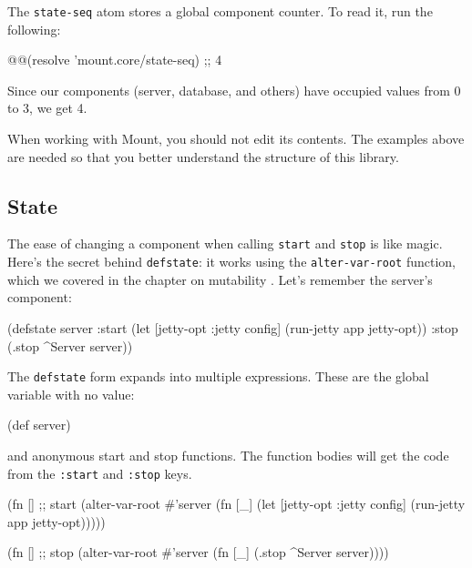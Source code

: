 The \verb|state-seq| atom stores a global component counter. To read it, run the following:

\begin{english}
  \begin{clojure}
@@(resolve 'mount.core/state-seq) ;; 4
  \end{clojure}
\end{english}

\noindent
Since our components (server, database, and others) have occupied values from 0 to 3, we get 4.

When working with Mount, you should not edit its contents. The examples above are needed so that you better understand the structure of this library.

\subsection{State}


The ease of changing a component when calling \verb|start| and \verb|stop| is like magic. Here's the secret behind \verb|defstate|: it works using the \verb|alter-var-root| function, which we covered in the chapter on mutability . Let's remember the server's component:

\begin{english}
  \begin{clojure}
(defstate server
  :start
  (let [{jetty-opt :jetty} config]
    (run-jetty app jetty-opt))
  :stop
  (.stop ^Server server))
  \end{clojure}
\end{english}

The \verb|defstate| form expands  into multiple expressions. These are the global variable with no value:


\begin{english}
  \begin{clojure}
(def server)
  \end{clojure}
\end{english}

\noindent
and anonymous start and stop functions. The function bodies will get the code from the \verb|:start| and \verb|:stop| keys.

\begin{english}
  \begin{clojure}
(fn [] ;; start
  (alter-var-root #'server
   (fn [_]
     (let [{jetty-opt :jetty} config]
       (run-jetty app jetty-opt)))))

(fn [] ;; stop
  (alter-var-root #'server
   (fn [_]
     (.stop ^Server server))))
  \end{clojure}
\end{english}

